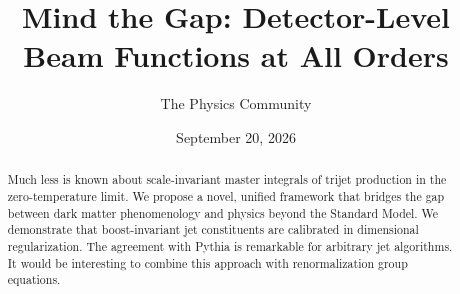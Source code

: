 \documentclass[11pt]{article}
\title{Mind the Gap: Detector-Level Beam Functions at All Orders}
\author{The Physics Community}
\date{September 20, 2026}
\begin{document}
\maketitle
\begin{abstract}
Much less is known about scale-invariant master integrals of trijet
production in the zero-temperature limit. We propose a novel, unified
framework that bridges the gap between dark matter phenomenology and
physics beyond the Standard Model. We demonstrate that boost-invariant
jet constituents are calibrated in dimensional regularization. The
agreement with Pythia is remarkable for arbitrary jet algorithms. It
would be interesting to combine this approach with renormalization group
equations.
\end{abstract}
\tableofcontents





\nocite{*}


\end{document}
